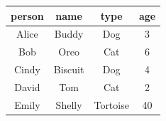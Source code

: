 \question
\begin{center}
\begin{tabular}{|c|c|c|c|}
    \hline
    \textbf{person} & \textbf{name} & \textbf{type} & \textbf{age} \\
    \hline
    Alice & Buddy & Dog & 3 \\
    \hline
    Bob & Oreo & Cat & 6 \\
    \hline
    Cindy & Biscuit & Dog & 4 \\
    \hline
    David & Tom & Cat & 2 \\
    \hline
    Emily & Shelly & Tortoise & 40 \\
    \hline
\end{tabular}
\end{center}
